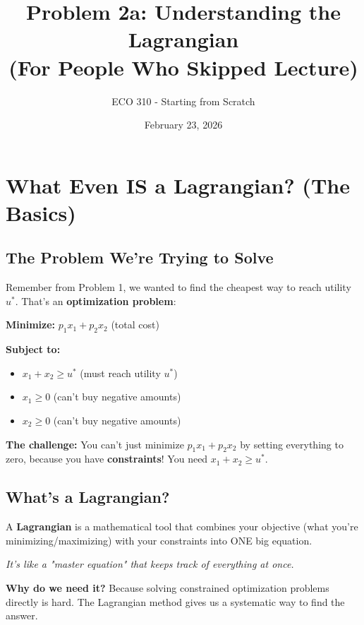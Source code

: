 \documentclass[11pt]{article}
\title{Problem 2a: Understanding the Lagrangian \\ (For People Who Skipped Lecture)}
\author{ECO 310 - Starting from Scratch}
\date{February 23, 2026}
\begin{document}
\maketitle

\section{What Even IS a Lagrangian? (The Basics)}

\subsection{The Problem We're Trying to Solve}

Remember from Problem 1, we wanted to find the cheapest way to reach utility $u^*$. That's an \textbf{optimization problem}:

\begin{tcolorbox}[colback=blue!5!white,colframe=blue!75!black,title=The Expenditure Minimization Problem]
\textbf{Minimize:} $p_1 x_1 + p_2 x_2$ (total cost)

\textbf{Subject to:}
\begin{itemize}
\item $x_1 + x_2 \geq u^*$ (must reach utility $u^*$)
\item $x_1 \geq 0$ (can't buy negative amounts)
\item $x_2 \geq 0$ (can't buy negative amounts)
\end{itemize}
\end{tcolorbox}

\textbf{The challenge:} You can't just minimize $p_1 x_1 + p_2 x_2$ by setting everything to zero, because you have \textbf{constraints}! You need $x_1 + x_2 \geq u^*$.

\subsection{What's a Lagrangian?}

A \textbf{Lagrangian} is a mathematical tool that combines your objective (what you're minimizing/maximizing) with your constraints into ONE big equation.

\begin{center}
\textit{It's like a "master equation" that keeps track of everything at once.}
\end{center}

\textbf{Why do we need it?} Because solving constrained optimization problems directly is hard. The Lagrangian method gives us a systematic way to find the answer.
\end{document}
